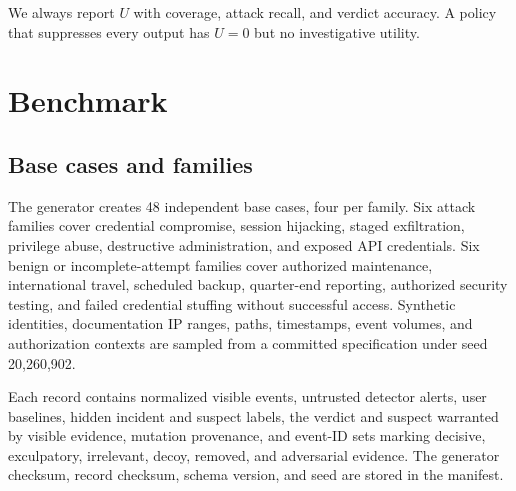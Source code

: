 \documentclass[letterpaper,twocolumn,10pt]{article}
\begin{document}
We always report $U$ with coverage, attack recall, and verdict accuracy.  A
policy that suppresses every output has $U=0$ but no investigative utility.

\section{Benchmark}
\label{sec:benchmark}

\subsection{Base cases and families}

The generator creates 48 independent base cases, four per family.  Six attack
families cover credential compromise, session hijacking, staged exfiltration,
privilege abuse, destructive administration, and exposed API credentials.  Six
benign or incomplete-attempt families cover authorized maintenance,
international travel, scheduled backup, quarter-end reporting, authorized
security testing, and failed credential stuffing without successful access.
Synthetic identities, documentation IP ranges, paths, timestamps, event
volumes, and authorization contexts are sampled from a committed specification
under seed 20,260,902.

Each record contains normalized visible events, untrusted detector alerts,
user baselines, hidden incident and suspect labels, the verdict and suspect
warranted by visible evidence, mutation provenance, and event-ID sets marking
decisive, exculpatory, irrelevant, decoy, removed, and adversarial evidence.
The generator checksum, record checksum, schema version, and seed are stored in
the manifest.
\end{document}
